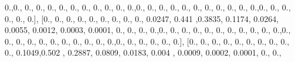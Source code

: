 \documentclass[
]{book}
\newenvironment{Shaded}{\begin{snugshade}}{\end{snugshade}}
\newcommand{\FloatTok}[1]{\textcolor[rgb]{0.00,0.00,0.81}{#1}}
\newcommand{\NormalTok}[1]{#1}
\begin{document}
\begin{Shaded}
\begin{Highlighting}[]
\FloatTok{0.}\NormalTok{,}\FloatTok{0.}\NormalTok{, }\FloatTok{0.}\NormalTok{, }\FloatTok{0.}\NormalTok{, }\FloatTok{0.}\NormalTok{, }\FloatTok{0.}\NormalTok{, }\FloatTok{0.}\NormalTok{, }\FloatTok{0.}\NormalTok{, }\FloatTok{0.}\NormalTok{, }\FloatTok{0.}\NormalTok{, }\FloatTok{0.}\NormalTok{, }\FloatTok{0.}\NormalTok{,}\FloatTok{0.}\NormalTok{, }\FloatTok{0.}\NormalTok{, }\FloatTok{0.}\NormalTok{, }\FloatTok{0.}\NormalTok{, }\FloatTok{0.}\NormalTok{, }\FloatTok{0.}\NormalTok{, }\FloatTok{0.}\NormalTok{, }\FloatTok{0.}\NormalTok{,}
\FloatTok{0.}\NormalTok{, }\FloatTok{0.}\NormalTok{, }\FloatTok{0.}\NormalTok{,}\FloatTok{0.}\NormalTok{, }\FloatTok{0.}\NormalTok{, }\FloatTok{0.}\NormalTok{, }\FloatTok{0.}\NormalTok{, }\FloatTok{0.}\NormalTok{, }\FloatTok{0.}\NormalTok{], [}\FloatTok{0.}\NormalTok{, }\FloatTok{0.}\NormalTok{, }\FloatTok{0.}\NormalTok{, }\FloatTok{0.}\NormalTok{, }\FloatTok{0.}\NormalTok{, }\FloatTok{0.}\NormalTok{, }\FloatTok{0.}\NormalTok{, }\FloatTok{0.}\NormalTok{, }\FloatTok{0.}\NormalTok{, }\FloatTok{0.0247}\NormalTok{,}
\FloatTok{0.441}\NormalTok{ ,}\FloatTok{0.3835}\NormalTok{, }\FloatTok{0.1174}\NormalTok{, }\FloatTok{0.0264}\NormalTok{, }\FloatTok{0.0055}\NormalTok{, }\FloatTok{0.0012}\NormalTok{, }\FloatTok{0.0003}\NormalTok{, }\FloatTok{0.0001}\NormalTok{, }\FloatTok{0.}\NormalTok{, }\FloatTok{0.}\NormalTok{, }\FloatTok{0.}\NormalTok{,}
\FloatTok{0.}\NormalTok{,}\FloatTok{0.}\NormalTok{, }\FloatTok{0.}\NormalTok{, }\FloatTok{0.}\NormalTok{, }\FloatTok{0.}\NormalTok{, }\FloatTok{0.}\NormalTok{, }\FloatTok{0.}\NormalTok{, }\FloatTok{0.}\NormalTok{, }\FloatTok{0.}\NormalTok{, }\FloatTok{0.}\NormalTok{, }\FloatTok{0.}\NormalTok{, }\FloatTok{0.}\NormalTok{,}\FloatTok{0.}\NormalTok{, }\FloatTok{0.}\NormalTok{, }\FloatTok{0.}\NormalTok{, }\FloatTok{0.}\NormalTok{, }\FloatTok{0.}\NormalTok{, }\FloatTok{0.}\NormalTok{, }\FloatTok{0.}\NormalTok{, }\FloatTok{0.}\NormalTok{,}
\FloatTok{0.}\NormalTok{, }\FloatTok{0.}\NormalTok{, }\FloatTok{0.}\NormalTok{,}\FloatTok{0.}\NormalTok{, }\FloatTok{0.}\NormalTok{, }\FloatTok{0.}\NormalTok{, }\FloatTok{0.}\NormalTok{, }\FloatTok{0.}\NormalTok{, }\FloatTok{0.}\NormalTok{], [}\FloatTok{0.}\NormalTok{, }\FloatTok{0.}\NormalTok{, }\FloatTok{0.}\NormalTok{, }\FloatTok{0.}\NormalTok{, }\FloatTok{0.}\NormalTok{, }\FloatTok{0.}\NormalTok{, }\FloatTok{0.}\NormalTok{, }\FloatTok{0.}\NormalTok{, }\FloatTok{0.}\NormalTok{, }\FloatTok{0.}\NormalTok{,}
\FloatTok{0.1049}\NormalTok{,}\FloatTok{0.502}\NormalTok{ , }\FloatTok{0.2887}\NormalTok{, }\FloatTok{0.0809}\NormalTok{, }\FloatTok{0.0183}\NormalTok{, }\FloatTok{0.004}\NormalTok{ , }\FloatTok{0.0009}\NormalTok{, }\FloatTok{0.0002}\NormalTok{, }\FloatTok{0.0001}\NormalTok{, }\FloatTok{0.}\NormalTok{, }\FloatTok{0.}\NormalTok{,}

\end{Highlighting}
\end{Shaded}
\end{document}
